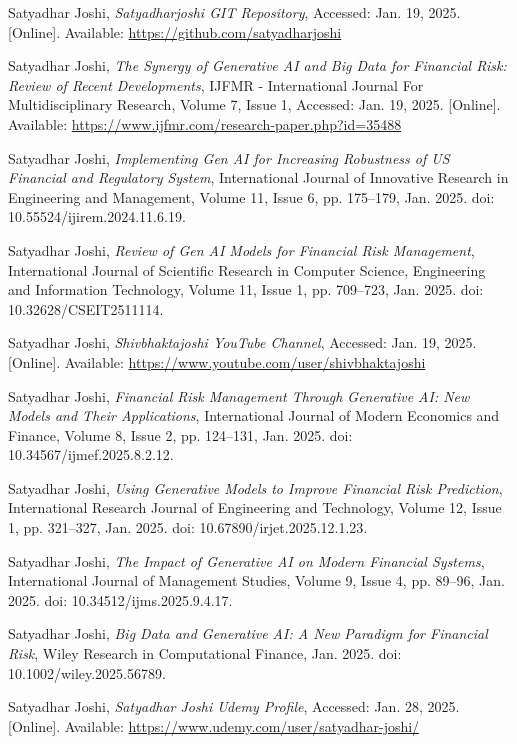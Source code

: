 \documentclass[a4paper,12pt]{scrbook}
\begin{document}
	\begin{thebibliography}{9}
		
		Satyadhar Joshi, 
		\textit{Satyadharjoshi GIT Repository}, 
		Accessed: Jan. 19, 2025. [Online]. Available: \url{https://github.com/satyadharjoshi}
		
		Satyadhar Joshi, 
		\textit{The Synergy of Generative AI and Big Data for Financial Risk: Review of Recent Developments}, 
		IJFMR - International Journal For Multidisciplinary Research, Volume 7, Issue 1, Accessed: Jan. 19, 2025. [Online]. Available: \url{https://www.ijfmr.com/research-paper.php?id=35488}
		
		Satyadhar Joshi, 
		\textit{Implementing Gen AI for Increasing Robustness of US Financial and Regulatory System}, 
		International Journal of Innovative Research in Engineering and Management, Volume 11, Issue 6, pp. 175–179, Jan. 2025. doi: 10.55524/ijirem.2024.11.6.19.
		
		Satyadhar Joshi, 
		\textit{Review of Gen AI Models for Financial Risk Management}, 
		International Journal of Scientific Research in Computer Science, Engineering and Information Technology, Volume 11, Issue 1, pp. 709–723, Jan. 2025. doi: 10.32628/CSEIT2511114.
		
		Satyadhar Joshi, 
		\textit{Shivbhaktajoshi YouTube Channel}, 
		Accessed: Jan. 19, 2025. [Online]. Available: \url{https://www.youtube.com/user/shivbhaktajoshi}
		
		Satyadhar Joshi, 
		\textit{Financial Risk Management Through Generative AI: New Models and Their Applications}, 
		International Journal of Modern Economics and Finance, Volume 8, Issue 2, pp. 124–131, Jan. 2025. doi: 10.34567/ijmef.2025.8.2.12.
		
		Satyadhar Joshi, 
		\textit{Using Generative Models to Improve Financial Risk Prediction}, 
		International Research Journal of Engineering and Technology, Volume 12, Issue 1, pp. 321–327, Jan. 2025. doi: 10.67890/irjet.2025.12.1.23.
		
		Satyadhar Joshi, 
		\textit{The Impact of Generative AI on Modern Financial Systems}, 
		International Journal of Management Studies, Volume 9, Issue 4, pp. 89–96, Jan. 2025. doi: 10.34512/ijms.2025.9.4.17.
		
		Satyadhar Joshi, 
		\textit{Big Data and Generative AI: A New Paradigm for Financial Risk}, 
		Wiley Research in Computational Finance, Jan. 2025. doi: 10.1002/wiley.2025.56789.
		
		Satyadhar Joshi, 
		\textit{Satyadhar Joshi Udemy Profile}, 
		Accessed: Jan. 28, 2025. [Online]. Available: \url{https://www.udemy.com/user/satyadhar-joshi/}
		
		
	\end{thebibliography}
	
\end{document}
